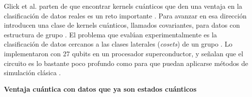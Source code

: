 Glick et al. parten de que encontrar kernels cuánticos que den una ventaja en la clasificación de datos reales es un reto importante \cite{Glick2024Covariant}.
Para avanzar en esa dirección introducen una clase de kernels cuánticos, llamados covariantes, para datos con estructura de grupo \cite{Glick2024Covariant}.
El problema que evalúan experimentalmente es la clasificación de datos cercanos a las clases laterales (\textit{cosets}) de un grupo \cite{Glick2024Covariant}.
Lo implementaron con 27 qubits en un procesador superconductor, y señalan que el circuito es lo bastante poco profundo como para que puedan aplicarse métodos de simulación clásica \cite{Glick2024Covariant}.

\textbf{Ventaja cuántica con datos que ya son estados cuánticos}

